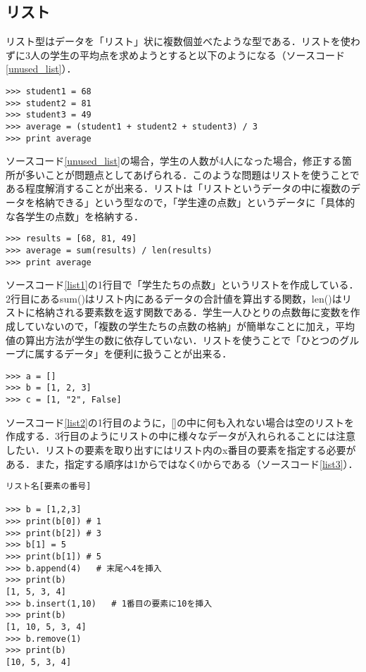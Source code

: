 \subsection{リスト}
リスト型はデータを「リスト」状に複数個並べたような型である．リストを使わずに3人の学生の平均点を求めようとすると以下のようになる（ソースコード\ref{unused_list}）．
\begin{lstlisting}[caption=リストを使わない場合, label=unused_list]
>>> student1 = 68
>>> student2 = 81
>>> student3 = 49
>>> average = (student1 + student2 + student3) / 3
>>> print average
\end{lstlisting}
ソースコード\ref{unused_list}の場合，学生の人数が4人になった場合，修正する箇所が多いことが問題点としてあげられる．このような問題はリストを使うことである程度解消することが出来る．リストは「リストというデータの中に複数のデータを格納できる」という型なので，「学生達の点数」というデータに「具体的な各学生の点数」を格納する．
\begin{lstlisting}[caption=リストを使った場合, label=list1]
>>> results = [68, 81, 49]
>>> average = sum(results) / len(results)
>>> print average
\end{lstlisting}
ソースコード\ref{list1}の1行目で「学生たちの点数」というリストを作成している．2行目にあるsum()はリスト内にあるデータの合計値を算出する関数，len()はリストに格納される要素数を返す関数である．学生一人ひとりの点数毎に変数を作成していないので，「複数の学生たちの点数の格納」が簡単なことに加え，平均値の算出方法が学生の数に依存していない．リストを使うことで「ひとつのグループに属するデータ」を便利に扱うことが出来る．
\begin{lstlisting}[caption=リストの使い方1, label=list2]
>>> a = []
>>> b = [1, 2, 3]
>>> c = [1, "2", False]
\end{lstlisting}
ソースコード\ref{list2}の1行目のように，[]の中に何も入れない場合は空のリストを作成する．3行目のようにリストの中に様々なデータが入れられることには注意したい．リストの要素を取り出すにはリスト内のx番目の要素を指定する必要がある．また，指定する順序は1からではなく0からである（ソースコード\ref{list3}）．
\begin{lstlisting}[caption=リストの使い方2, label=list3]
リスト名[要素の番号]

>>> b = [1,2,3]
>>> print(b[0]) # 1
>>> print(b[2]) # 3
>>> b[1] = 5
>>> print(b[1]) # 5
>>> b.append(4)   # 末尾へ4を挿入
>>> print(b)
[1, 5, 3, 4]
>>> b.insert(1,10)   # 1番目の要素に10を挿入
>>> print(b)
[1, 10, 5, 3, 4]
>>> b.remove(1)
>>> print(b)
[10, 5, 3, 4]
\end{lstlisting}

